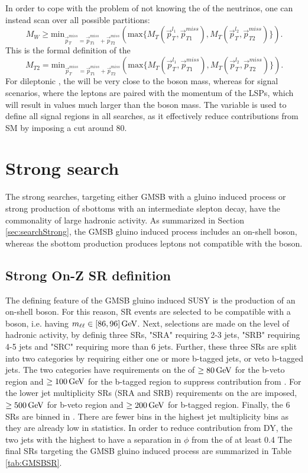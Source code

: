 In order to cope with the problem of not knowing the \pt of the neutrinos, one can instead scan over all possible \ptmiss partitions: 
\begin{equation}
M_{W}\geq \mathrm{min}_{\vec{p}_{T}^{miss}=\vec{p}_{T1}^{miss}+\vec{p}_{T2}^{miss}}\left( \mathrm{max}\{M_{T}\left(\vec{p}_{T}^{l_{1}},\vec{p}_{T1}^{miss}\right), M_{T}\left(\vec{p}_{T}^{l_{2}},\vec{p}_{T2}^{miss}\right)\}\right).
\end{equation}
This is the formal definition of the \mttwo 
\begin{equation}
M_{T2}= \mathrm{min}_{\vec{p}_{T}^{miss}=\vec{p}_{T1}^{miss}+\vec{p}_{T2}^{miss}}\left( \mathrm{max}\{M_{T}\left(\vec{p}_{T}^{l_{1}},\vec{p}_{T1}^{miss}\right), M_{T}\left(\vec{p}_{T}^{l_{2}},\vec{p}_{T2}^{miss}\right)\}\right).
\end{equation}
For dileptonic \ttbar, the \mttwo will be very close to the \PW boson mass, whereas for signal scenarios, where the leptons are paired with the momentum of the LSPs, which will result in values much larger than the \PW boson mass. 
The \mttwo variable is used to define all signal regions in all searches, as it effectively reduce contributions from SM \ttbar by imposing a cut around 80\GeV.
\section{Strong search} 
The strong searches, targeting either GMSB with a gluino induced process or strong production of sbottoms with an intermediate slepton decay, have the commonality of large hadronic activity. 
As summarized in Section \ref{sec:searchStrong}, the GMSB gluino induced process includes an on-shell \PZ boson, whereas the sbottom production produces leptons not compatible with the \PZ boson. 
\subsection{Strong On-Z SR definition}
The defining feature of the GMSB gluino induced SUSY is the production of an on-shell \PZ boson. 
For this reason, SR events are selected to be compatible with a \PZ boson, i.e. having $m_{\ell\ell}\in[86,96]\,\text{Ge\hspace{-.08em}V}$. 
Next, selections are made on the level of hadronic activity, by definig three SRs, "SRA" requiring 2-3 jets, "SRB" requiring 4-5 jets and "SRC" requiring more than 6 jets. 
Further, these three SRs are split into two categories by requiring either one or more b-tagged jets, or veto b-tagged jets. 
The two categories have requirements on the \mttwo of $\geq80\,\text{Ge\hspace{-.08em}V}$ for the b-veto region and $\geq100\,\text{Ge\hspace{-.08em}V}$ for the b-tagged region to suppress contribution from \ttbar.
For the lower jet multiplicity SRs (SRA and SRB) requirements on the \HT are imposed, $\geq500\,\text{Ge\hspace{-.08em}V}$ for b-veto region and $\geq200\,\text{Ge\hspace{-.08em}V}$ for b-tagged region. 
Finally, the 6 SRs are binned in \ptmiss. There are fewer \ptmiss bins in the highest jet multiplicity bins as they are already low in statistics. 
In order to reduce contribution from DY, the two jets with the highest \pt to have a separation in $\phi$ from the \ptmiss of at least 0.4
The final SRs targeting the GMSB gluino induced process are summarized in Table \ref{tab:GMSBSR}. 

